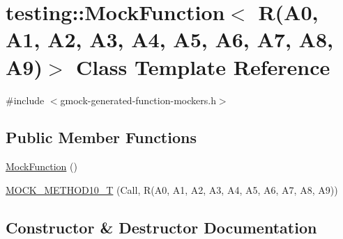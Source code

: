 \hypertarget{classtesting_1_1MockFunction_3_01R_07A0_00_01A1_00_01A2_00_01A3_00_01A4_00_01A5_00_01A6_00_01A7_00_01A8_00_01A9_08_4}{}\section{testing\+:\+:Mock\+Function$<$ R(A0, A1, A2, A3, A4, A5, A6, A7, A8, A9)$>$ Class Template Reference}
\label{classtesting_1_1MockFunction_3_01R_07A0_00_01A1_00_01A2_00_01A3_00_01A4_00_01A5_00_01A6_00_01A7_00_01A8_00_01A9_08_4}


{\ttfamily \#include $<$gmock-\/generated-\/function-\/mockers.\+h$>$}

\subsection*{Public Member Functions}
\begin{DoxyCompactItemize}
\item 
\hyperlink{classtesting_1_1MockFunction_3_01R_07A0_00_01A1_00_01A2_00_01A3_00_01A4_00_01A5_00_01A6_00_01A7_00_01A8_00_01A9_08_4_af5faa98b52d5b5032c57022cdf96d21d}{Mock\+Function} ()
\item 
\hyperlink{classtesting_1_1MockFunction_3_01R_07A0_00_01A1_00_01A2_00_01A3_00_01A4_00_01A5_00_01A6_00_01A7_00_01A8_00_01A9_08_4_adb493fcbb4936734eda9cf99b4d0acd0}{M\+O\+C\+K\+\_\+\+M\+E\+T\+H\+O\+D10\+\_\+T} (Call, R(A0, A1, A2, A3, A4, A5, A6, A7, A8, A9))
\end{DoxyCompactItemize}


\subsection{Constructor \& Destructor Documentation}
